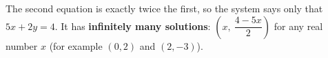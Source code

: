 The second equation is exactly twice the first, so the system says only that $5x+2y=4$. It has \textbf{infinitely many solutions}: $\boxed{\left(x,\ \dfrac{4-5x}{2}\right)}$ for any real number $x$ (for example $(0,2)$ and $(2,-3)$).
